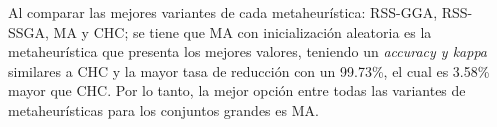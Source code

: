 Al comparar las mejores variantes de cada metaheurística: RSS-GGA, RSS-SSGA, MA y CHC; se tiene que MA con inicialización aleatoria es la metaheurística que presenta los mejores valores, teniendo un \emph{accuracy y kappa} similares a CHC y la mayor tasa de reducción con un 99.73\%, el cual es 3.58\% mayor que CHC. Por lo tanto, la mejor opción entre todas las variantes de metaheurísticas para los conjuntos grandes es MA. 


